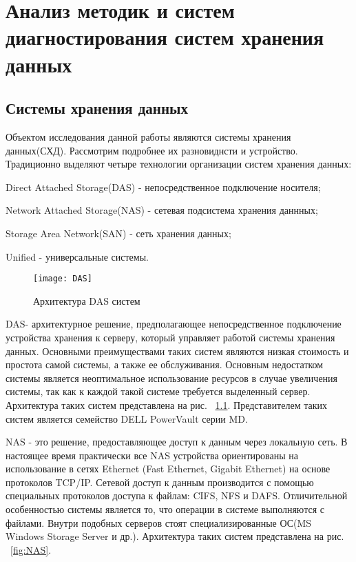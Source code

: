 \chapter{Анализ методик и систем диагностирования систем хранения данных}
\section{Системы хранения данных}
Объектом исследования данной работы являются системы хранения данных(СХД). Рассмотрим подробнее их разновиднсти и устройство. 
Традиционно выделяют четыре технологии организации систем хранения данных: 
\begin{itemize*}
	\item{Direct Attached Storage(DAS) - непосредственное подключение носителя;}
	\item{Network Attached Storage(NAS) - сетевая подсистема хранения даннных;}
	\item{Storage Area Network(SAN) - сеть хранения данных;}
	\item{Unified - универсальные системы.}
\end{itemize*}

\begin{figure}[!h]
	\centering
	\texttt{[image: DAS]}
	\caption{Архитектура DAS систем}
	\label{fig:DAS}
\end{figure}

DAS- архитектурное решение, предполагающее непосредственное подключение устройства хранения к серверу, который управляет работой системы хранения данных. Основными преимуществами таких систем являются низкая стоимость и простота самой системы, а также ее обслуживания. Основным недостатком системы является неоптимальное использование ресурсов в случае увеличения системы, так как к каждой такой системе требуется выделенный сервер. Архитектура таких систем представлена на рис. ~\ref{fig:DAS}. Представителем таких систем является семейство DELL PowerVault серии MD.

NAS - это решение, предоставляющее доступ к данным через локальную сеть. В настоящее время практически все NAS устройства ориентированы на использование в сетях Ethernet (Fast Ethernet, Gigabit Ethernet) на основе протоколов TCP/IP. Сетевой доступ к данным производится с помощью специальных протоколов доступа к файлам: CIFS, NFS и DAFS. Отличительной особенностью системы является то, что операции в системе выполняются с файлами. Внутри подобных серверов стоят специализированные ОС(MS Windows Storage Server и др.). Архитектура таких систем представлена на рис. ~\ref{fig:NAS}.

